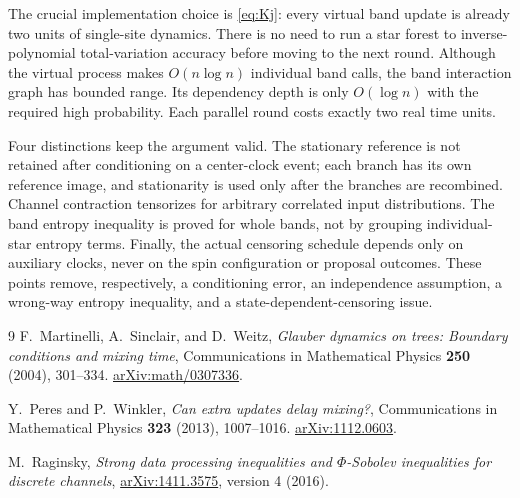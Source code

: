 \documentclass[11pt,reqno]{amsart}
\theoremstyle{remark}
\numberwithin{equation}{section}
\begin{document}
The crucial implementation choice is \eqref{eq:Kj}: every virtual band update is already two units of single-site dynamics. There is no need to run a star forest to inverse-polynomial total-variation accuracy before moving to the next round. Although the virtual process makes $O(n\log n)$ individual band calls, the band interaction graph has bounded range. Its dependency depth is only $O(\log n)$ with the required high probability. Each parallel round costs exactly two real time units.

Four distinctions keep the argument valid. The stationary reference is not retained after conditioning on a center-clock event; each branch has its own reference image, and stationarity is used only after the branches are recombined. Channel contraction tensorizes for arbitrary correlated input distributions. The band entropy inequality is proved for whole bands, not by grouping individual-star entropy terms. Finally, the actual censoring schedule depends only on auxiliary clocks, never on the spin configuration or proposal outcomes. These points remove, respectively, a conditioning error, an independence assumption, a wrong-way entropy inequality, and a state-dependent-censoring issue.

\begin{thebibliography}{9}
F.~Martinelli, A.~Sinclair, and D.~Weitz,
\emph{Glauber dynamics on trees: Boundary conditions and mixing time},
Communications in Mathematical Physics \textbf{250} (2004), 301--334.
\href{https://arxiv.org/abs/math/0307336}{arXiv:math/0307336}.

Y.~Peres and P.~Winkler,
\emph{Can extra updates delay mixing?},
Communications in Mathematical Physics \textbf{323} (2013), 1007--1016.
\href{https://arxiv.org/abs/1112.0603}{arXiv:1112.0603}.

M.~Raginsky,
\emph{Strong data processing inequalities and $\Phi$-Sobolev inequalities for discrete channels},
\href{https://arxiv.org/abs/1411.3575}{arXiv:1411.3575}, version 4 (2016).
\end{thebibliography}
\end{document}
